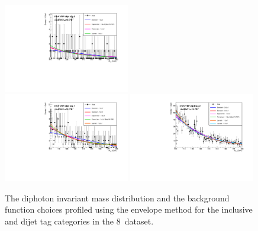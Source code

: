 \begin{figure}
  \includegraphics[width=0.49\textwidth]{analysis/plots/multipdf_plots/cat5_8TeV.pdf}\\
  \includegraphics[width=0.49\textwidth]{analysis/plots/multipdf_plots/cat6_8TeV.pdf}
  \includegraphics[width=0.49\textwidth]{analysis/plots/multipdf_plots/cat7_8TeV.pdf}
  \caption{The diphoton invariant mass distribution and the background function choices profiled using the envelope method for the inclusive and \VBF dijet tag categories in the 8~\TeV dataset.}
  \label{fig:multipdf3}
\end{figure}

